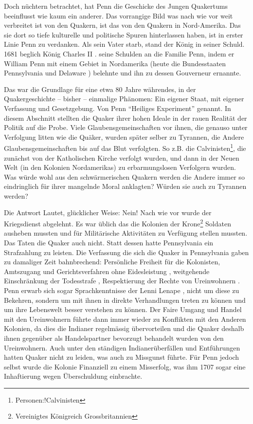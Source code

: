 \medskip

Doch nüchtern betrachtet, hat Penn die Geschicke des Jungen Quakertums
beeinflusst wie kaum  ein anderer. Das vorrangige Bild was nach wie vor weit
verbreitet ist von den Quakern, ist das von den Quakern in Nord-Amerika. Das sie
dort so tiefe kulturelle und politische Spuren hinterlassen haben, ist in erster
Linie Penn zu verdanken. Als sein Vater starb, stand der König in seiner Schuld.
1681 beglich König Charles II . seine
Schulden  an die Familie Penn, indem er William Penn mit einem
Gebiet in Nordamerika (heute die Bundesstaaten Pennsylvania
 und Delaware ) belehnte und ihn
zu dessen Gouverneur ernannte.


Das war die Grundlage für eine etwa 80 Jahre währendes, in der Quakergeschichte
-- bisher -- einmalige Phänomen: Ein eigener Staat, mit eigener Verfassung und
Gesetzgebung. Von Penn "`Heiliges Experiment"' genannt. In diesem Abschnitt
stellten die Quaker ihrer hohen Ideale in der rauen Realität der Politik auf die
Probe. Viele Glaubensgemeinschaften vor ihnen, die genauso unter Verfolgung
litten wie die Quäker, wurden später selber zu Tyrannen, die Andere
Glaubensgemeinschaften bis auf das Blut verfolgten. So z.B. die
Calvinisten\footnote{Personen:!Calvinisten}, die zunächst von der Katholischen
Kirche verfolgt wurden, und dann in der Neuen Welt (in den Kolonien
Nordamerikas) zu erbarmungslosen Verfolgern wurden. Was würde wohl aus den
schwärmerischen Quakern werden die Andere immer so eindringlich für ihrer
mangelnde Moral anklagten? Würden sie auch zu Tyrannen werden?

\medskip

Die Antwort Lautet, glücklicher Weise: Nein! Nach wie vor wurde der Kriegsdienst
abgelehnt. Es war üblich das die Kolonien der Krone\footnote{Vereinigtes
Königreich Grossbritannien} Soldaten ausheben mussten und für Militärische
Aktivitäten zu Verfügung stellen mussten. Das Taten die Quaker auch nicht. Statt
dessen hatte Pennsylvania ein Strafzahlung zu leisten. Die Verfassung die sich
die Quaker in Pennsylvania gaben zu damaliger Zeit bahnbrechend: Persönliche
Freiheit für die Kolonisten, Amtszugang und Gerichtsverfahren ohne
Eidesleistung , weitgehende Einschränkung der Todesstrafe
, Respektierung der Rechte von Ureinwohnern
. Penn erwarb sich sogar Sprachkenntnisse
 der Lenni Lenape , nicht
um diese zu Bekehren, sondern um mit ihnen in direkte Verhandlungen treten zu
können und um ihre Lebenswelt besser verstehen zu können. Der Faire Umgang und
Handel mit den Ureinwohnern führte dann immer wieder zu Konflikten mit den
Anderen Kolonien, da dies die Indianer regelmässig übervorteilen und die Quaker
deshalb ihnen gegenüber als Handelspartner bevorzugt behandelt wurden von den
Ureinwohnern. Auch unter den ständigen Indianerüberfällen und Entführungen
hatten Quaker nicht zu leiden, was auch zu Missgunst führte. Für Penn jedoch
selbst wurde die Kolonie Finanziell zu einem Misserfolg, was ihm 1707 sogar eine
Inhaftierung
 wegen Überschuldung einbrachte.

